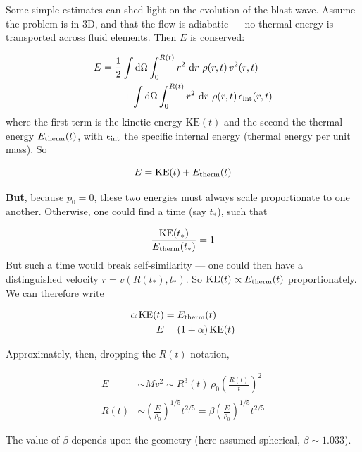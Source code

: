 \documentclass[notoc]{tufte-handout}
\begin{document}
Some simple estimates can shed light on the evolution of the blast wave. Assume the problem is in 3D, and that the flow is adiabatic --- no thermal energy is transported across fluid elements. Then $E$ is conserved:

\begin{align}
E & = \frac{1}{2}\int \mathrm{d}\Omega \int_0^{R(t)} r^2~\mathrm{d}r ~\rho(r,t) \, v^2(r,t) \\
& \qquad + \int \mathrm{d}\Omega \int_0^{R(t)} r^2~\mathrm{d}r ~\rho(r,t)\, \epsilon_{\rm int}(r,t)
\end{align}
%
where the first term is the kinetic energy $\mathrm{KE}(t)$ and the second the thermal energy $E_{\rm therm}(t)$, with $\epsilon_{\rm int}$ the specific internal energy (thermal energy per unit mass). So

\begin{equation}
E = \mathrm{KE}(t) + E_{\rm therm}(t)
\end{equation}

{\bf But}, because $p_0 = 0$, these two energies must always scale proportionate to one another. Otherwise, one could find a time (say $t_*$), such that

\begin{equation}
\frac{\mathrm{KE}(t_*)}{E_{\rm therm}(t_*)} = 1
\end{equation}
%
But such a time would break self-similarity --- one could then have a distinguished velocity $\dot{r} = v(R(t_*), t_*)$. So $\mathrm{KE}(t) \propto E_{\rm therm}(t)$ proportionately. We can therefore write

\begin{align}
\alpha \, \mathrm{KE}(t) & = E_{\rm therm}(t) \\
E & = (1 + \alpha)\, \mathrm{KE}(t)
\end{align}

Approximately, then, dropping the $R(t)$ notation,

\begin{align}
E & \sim M v^2 \sim R^3(t)\, \rho_0 \left( \frac{R(t)}{t} \right)^2 \\
R(t) & \sim \left( \frac{E}{\rho_0} \right)^{1/5} t^{2/5} = \beta \left( \frac{E}{\rho_0} \right)^{1/5} t^{2/5}
\end{align}

The value of $\beta$ depends upon the geometry (here assumed spherical, $\beta \sim 1.033$). 
\end{document}
